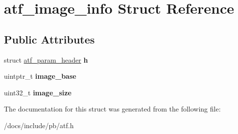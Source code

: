 \hypertarget{structatf__image__info}{}\section{atf\+\_\+image\+\_\+info Struct Reference}
\label{structatf__image__info}
\subsection*{Public Attributes}
\begin{DoxyCompactItemize}
\item 
\mbox{\label{structatf__image__info_ab95f62b3c9ed52454e6c5b011a997f5f}} 
struct \hyperlink{structatf__param__header}{atf\+\_\+param\+\_\+header} {\bfseries h}
\item 
\mbox{\label{structatf__image__info_ad5d5598ca6065d3f2455afa6de335c06}} 
uintptr\+\_\+t {\bfseries image\+\_\+base}
\item 
\mbox{\label{structatf__image__info_a70b1f71ff2bf7d5ac32965293556a695}} 
uint32\+\_\+t {\bfseries image\+\_\+size}
\end{DoxyCompactItemize}


The documentation for this struct was generated from the following file\+:\begin{DoxyCompactItemize}
\item 
/docs/include/pb/atf.\+h\end{DoxyCompactItemize}
